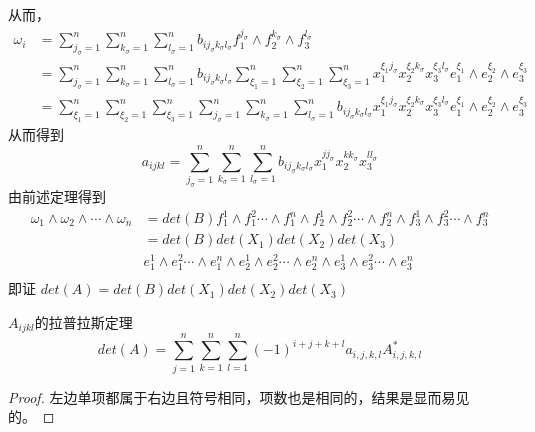 \documentclass{amsc}          %
\numberwithin{equation}{section} %
\begin{document}
\begin{prof}
从而，
\begin{equation}
\begin{aligned}
\omega_{i}
&= \sum_{j_{\sigma}=1}^{n}\sum_{k_{\sigma}=1}^{n}\sum_{l_{\sigma}=1}^{n} b_{ij_{\sigma}k_{\sigma}l_{\sigma}} f_{1}^{j_{\sigma}} \wedge f_{2}^{k_{\sigma}} \wedge f_{3}^{l_{\sigma}} \\
&= \sum_{j_{\sigma}=1}^{n}\sum_{k_{\sigma}=1}^{n}\sum_{l_{\sigma}=1}^{n} b_{ij_{\sigma}k_{\sigma}l_{\sigma}}
\sum_{\xi_{1}=1}^{n}\sum_{\xi_{2}=1}^{n}\sum_{\xi_{3}=1}^{n}x_{1}^{\xi_{1}j_{\sigma}}x_{2}^{\xi_{2}k_{\sigma}}x_{3}^{\xi_{3}l_{\sigma}}e_{1}^{\xi_{1}}\wedge e_{2}^{\xi_{2}}\wedge e_{3}^{\xi_{3}}\\
&= \sum_{\xi_{1}=1}^{n}\sum_{\xi_{2}=1}^{n}\sum_{\xi_{3}=1}^{n}\sum_{j_{\sigma}=1}^{n}\sum_{k_{\sigma}=1}^{n}\sum_{l_{\sigma}=1}^{n}b_{ij_{\sigma}k_{\sigma}l_{\sigma}}
x_{1}^{\xi_{1}j_{\sigma}}x_{2}^{\xi_{2}k_{\sigma}}x_{3}^{\xi_{3}l_{\sigma}}e_{1}^{\xi_{1}}\wedge e_{2}^{\xi_{2}}\wedge e_{3}^{\xi_{3}}
\end{aligned}\end{equation}
从而得到
$$a_{ijkl}=\sum_{j_{\sigma}=1}^{n}\sum_{k_{\sigma}=1}^{n}\sum_{l_{\sigma}=1}^{n}b_{ij_{\sigma}k_{\sigma}l_{\sigma}}x_{1}^{jj_{\sigma}}x_{2}^{kk_{\sigma}}x_{3}^{ll_{\sigma}}$$
由前述定理得到
\begin{equation}
\begin{aligned}
\omega_{1}\wedge\omega_{2}\wedge\cdots\wedge\omega_{n}
& = det(B) f_{1}^1\wedge f_{1}^2 \cdots \wedge f_{1}^n \wedge f_{2}^1\wedge f_{2}^2 \cdots \wedge f_{2}^n
\wedge f_{3}^1\wedge f_{3}^2 \cdots \wedge f_{3}^n\\
& = det(B)det(X_{1})det(X_{2})det(X_{3}) \\
&e_{1}^1\wedge e_{1}^2 \cdots \wedge e_{1}^n \wedge e_{2}^1\wedge e_{2}^2 \cdots \wedge e_{2}^n
\wedge e_{3}^1\wedge e_{3}^2 \cdots \wedge e_{3}^n\\
\end{aligned}
\end{equation}
即证 $det(A) = det(B)det(X_{1})det(X_{2})det(X_{3})$
\\
\end{prof}

\begin{theorem}  $A_{ijkl}$的拉普拉斯定理
$$det(A)=\sum\limits_{j=1}^n \sum\limits_{k=1}^n \sum\limits_{l=1}^n (-1)^{i+j+k+l} a_{i,j,k,l} A^{*}_{i,j,k,l} $$
\end{theorem}
\begin{proof}
左边单项都属于右边且符号相同，项数也是相同的，结果是显而易见的。
\end{proof}
\end{document}
